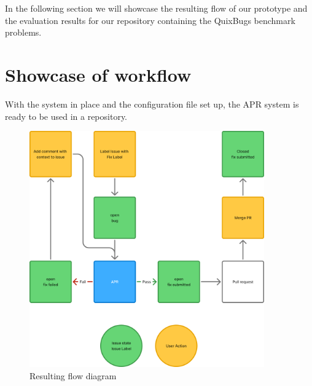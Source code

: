In the following section we will showcase the resulting flow of our prototype and the evaluation results for our repository containing the QuixBugs benchmark problems.
\section{Showcase of workflow}




With the system in place and the configuration file set up, the APR system is ready to be used in a repository.

\begin{figure}[H]
    \centering
    \includegraphics[width=0.9\textwidth]{images/flowcharts/flowresult.png}
    \caption{Resulting flow diagram}
    \label{fig:flow}
\end{figure}

